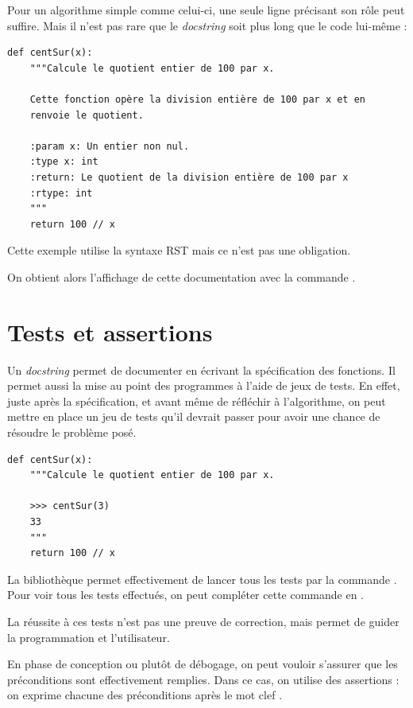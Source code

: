 Pour un algorithme simple comme celui-ci, une seule ligne précisant son rôle peut suffire. Mais il n'est pas rare que le \emph{docstring} soit plus long que le code lui-même :

  
  \vspace{-2ex}
\begin{verbatim}
def centSur(x):
    """Calcule le quotient entier de 100 par x.
    
    Cette fonction opère la division entière de 100 par x et en
    renvoie le quotient.
    
    :param x: Un entier non nul.
    :type x: int
    :return: Le quotient de la division entière de 100 par x
    :rtype: int
    """
    return 100 // x
\end{verbatim}

Cette exemple utilise la syntaxe RST mais ce n'est pas une obligation. 
 
 On obtient alors l'affichage de cette documentation avec la commande .

\section{Tests et assertions}

Un \emph{docstring} permet de documenter en écrivant la spécification des fonctions. Il permet aussi la mise au point des programmes à l'aide de jeux de tests. En effet, juste après la spécification, et avant même de réfléchir à l'algorithme, on peut mettre en place un jeu de tests qu'il devrait passer pour avoir une chance de résoudre le problème posé.

\begin{verbatim}
def centSur(x):
    """Calcule le quotient entier de 100 par x.
    
    >>> centSur(3)
    33
    """
    return 100 // x
\end{verbatim}

La bibliothèque  permet effectivement de lancer tous les tests par la commande . Pour voir tous les tests effectués, on peut compléter cette commande  en .

 La réussite à ces tests n'est pas une preuve de correction, mais permet de guider la programmation et l'utilisateur.
 
 \medskip
 
 En phase de conception ou plutôt de débogage, on peut vouloir s'assurer que les préconditions sont effectivement remplies. Dans ce cas, on utilise des assertions : on exprime chacune des préconditions après le mot clef . 
 
